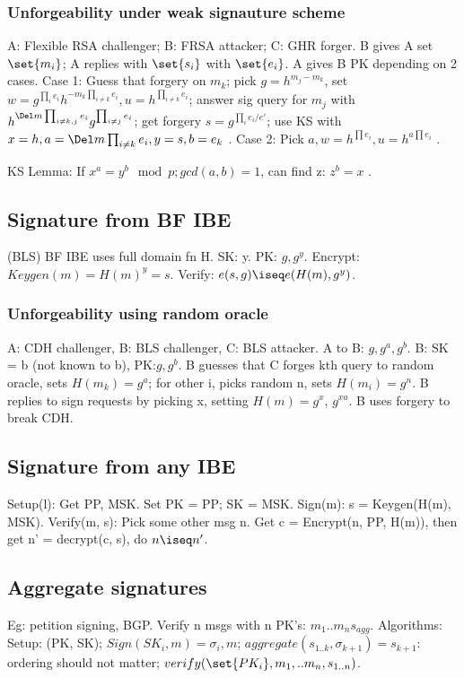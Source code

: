 \documentclass[oneside, article]{memoir}
\begin{document}
\subsubsection{Unforgeability under weak signauture scheme}
A: Flexible RSA challenger; B: FRSA attacker; C: GHR forger. B gives A set $\set{m_{i}}$; A replies with $\set{s_{i}}$ with $\set{e_{i}}$. A gives B PK depending on 2 cases. Case 1: Guess that forgery on $m_{k}$; pick $g = h^{m_{j} - m_{k}}$, set $w = g^{\prod_{i}e_{i}}h^{-m_{k}\prod_{i \neq k}e_{i}}, u = h^{\prod_{i \neq k}e_{i}}$; answer sig query for $m_{j}$ with $h^{\Del m  \prod_{i \neq k, j}e_{i}}g^{\prod_{i\neq j}e_{i}}$; get forgery $s = g^{\prod_{i} e_{i}/e'}$; use KS with $x=h, a = \Del m \prod_{i \neq k}e_{i}, y = s, b = e_{k}$ \chk. Case 2: Pick $a, w = h^{\prod e_{i}}, u = h^{a \prod e_{i}}$ \chk. \tbc

KS Lemma: If $x^{a} = y^{b} \mod p; gcd(a, b)=1$, can find z: $z^{b} = x$ \why.



\subsection{Signature from BF IBE}
(BLS) BF IBE uses full domain fn H. SK: y. PK: $g, g^{y}$. Encrypt: $Keygen(m) = H(m)^{y} = s$. Verify: $e(s, g) \iseq e(H(m), g^{y})$.

\subsubsection{Unforgeability using random oracle}
A: CDH challenger, B: BLS challenger, C: BLS attacker. A to B: $g, g^{a}, g^{b}$. B: SK = b (not known to b), PK:$g, g^{b}$. B guesses that C forges kth query to random oracle, sets $H(m_{k}) = g^{a}$; for other i, picks random n, sets $H(m_{i}) = g^{n}$. B replies to sign requests by picking x, setting $H(m) = g^{x}$, $g^{xa}$. B uses forgery to break CDH.

\subsection{Signature from any IBE}
Setup(l): Get PP, MSK. Set PK = PP; SK = MSK. Sign(m): s = Keygen(H(m), MSK). Verify(m, s): Pick some other msg n. Get c = Encrypt(n, PP, H(m)), then get n' = decrypt(c, s), do $n \iseq n'$.

\subsection{Aggregate signatures}
Eg: petition signing, BGP. Verify n msgs with n PK's: $m_{1} .. m_{n} s_{agg}$. Algorithms: Setup: (PK, SK); $Sign(SK_{i}, m) = \sigma_{i}, m$; $aggregate(s_{1 .. k}, \sigma_{k+1}) = s_{k+1}$: \\
ordering should not matter; $verify(\set{PK_{i}}, m_{1}, .. m_{n}, s_{1 .. n})$.
\end{document}
